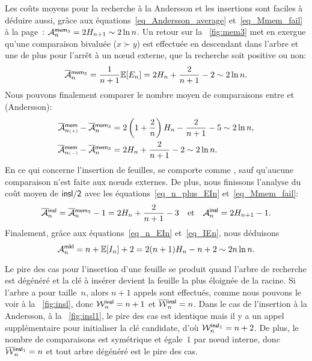 Les coûts moyens pour la recherche à la Andersson et les insertions
sont faciles à déduire aussi, grâce aux
équations~\eqref{eq_Andersson_average} 
et~\eqref{eq_Mmem_fail} à la page~\pageref{eq_Mmem_fail}:
\(\M{\fun{mem}_3}{n} = 2H_{n+1} \sim 2 \ln
n\). Un retour sur la
\fig~\vref{fig:mem3} met en exergue qu'une comparaison bivaluée (\(x
\succ y\)) est effectuée en descendant dans l'arbre et une de plus
pour l'arrêt à un n{\oe}ud externe, que la recherche soit positive ou
non:
\begin{equation*}
  \OM{\fun{mem}_3}{n} = \frac{1}{n+1}\Expected{E_n} =
  2H_n + \frac{2}{n+1} - 2 \sim 2\ln n.
\end{equation*}
Nous pouvons finalement comparer le nombre moyen de comparaisons entre
 et  (Andersson):
\begin{align*}
  \OM{\fun{mem}}{n{\scriptscriptstyle(+)}} - \OM{\fun{mem}_3}{n}
&= 2\left(1 + \frac{2}{n}\right)H_n - \frac{2}{n+1} - 5 \sim 2\ln n,\\
  \OM{\fun{mem}}{n{\scriptscriptstyle(-)}} - \OM{\fun{mem}_3}{n}
&= 2H_n + \frac{2}{n+1} - 2 \sim 2\ln n.
\end{align*}
En ce qui concerne l'insertion de feuilles,
 se comporte comme
, sauf qu'aucune
comparaison n'est faite aux n{\oe}uds externes. De plus, nous
finissons l'analyse du coût moyen de \(\fun{insl/2}\) avec les
équations~\eqref{eq_n_plus_EIn} et~\eqref{eq_Mmem_fail}:
\begin{equation*}
  \OM{\fun{insl}}{n} =
  \OM{\fun{mem}_3}{n} - 1 = 2H_n + \frac{2}{n+1} -
  3\quad\text{et}\quad \M{\fun{insl}}{n} = 2H_{n+1} - 1.
\index{insl@$\OM{\fun{insl}}{n}$}
\index{mem3@$\OM{\fun{mem}_3}{n}$}
\end{equation*}
Finalement, grâce aux équations~\eqref{eq_n_EIn} et~\eqref{eq_IEn},
nous déduisons
\begin{equation}
\M{\fun{mkl}}{n} = n + \Expected{I_n} + 2 = 2(n+1)H_n - n + 2
\sim 2n\ln n.
\index{mkl@$\M{\fun{mkl}}{n}$}
\label{eq_Mmkl}
\end{equation}


Le pire des cas pour l'insertion d'une feuille se produit quand
l'arbre de recherche est dégénéré
et la clé à insérer devient la feuille la plus éloignée de la racine.
Si l'arbre a pour taille~\(n\), alors \(n+1\) appels sont effectués,
comme nous pouvons le voir à la \fig~\vref{fig:insl}, donc
\(\W{\fun{insl}}{n} = n + 1\) et
\(\OW{\fun{insl}}{n} = n\). Dans le
cas de l'insertion à la Andersson, à la \fig~\vref{fig:insl1}, le pire
des cas est identique mais il y a un appel supplémentaire pour
initialiser la clé candidate, d'où \(\W{\fun{insl}_1}{n} = n +
2\). De plus, le nombre de
comparaisons est symétrique et égale~\(1\) par n{\oe}ud interne, donc
\(\OW{\fun{insl}_1}{n} = n\) et
tout arbre dégénéré est le pire des cas.

